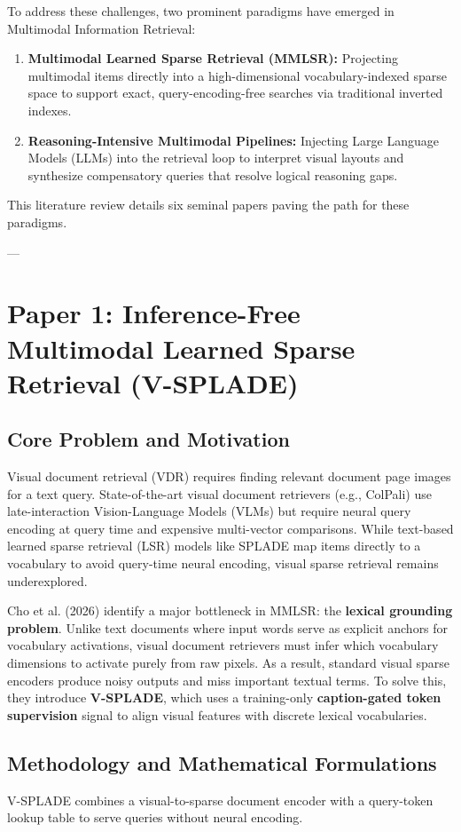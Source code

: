 \documentclass[11pt,a4paper]{article}
\begin{document}
To address these challenges, two prominent paradigms have emerged in Multimodal Information Retrieval:
\begin{enumerate}
    \item \textbf{Multimodal Learned Sparse Retrieval (MMLSR):} Projecting multimodal items directly into a high-dimensional vocabulary-indexed sparse space to support exact, query-encoding-free searches via traditional inverted indexes.
    \item \textbf{Reasoning-Intensive Multimodal Pipelines:} Injecting Large Language Models (LLMs) into the retrieval loop to interpret visual layouts and synthesize compensatory queries that resolve logical reasoning gaps.
\end{enumerate}
This literature review details six seminal papers paving the path for these paradigms.

---

\section{Paper 1: Inference-Free Multimodal Learned Sparse Retrieval (V-SPLADE)}
\label{sec:v_splade}

\subsection{Core Problem and Motivation}
Visual document retrieval (VDR) requires finding relevant document page images for a text query. State-of-the-art visual document retrievers (e.g., ColPali) use late-interaction Vision-Language Models (VLMs) but require neural query encoding at query time and expensive multi-vector comparisons. While text-based learned sparse retrieval (LSR) models like SPLADE map items directly to a vocabulary to avoid query-time neural encoding, visual sparse retrieval remains underexplored.

Cho et al. (2026) identify a major bottleneck in MMLSR: the \textbf{lexical grounding problem}. Unlike text documents where input words serve as explicit anchors for vocabulary activations, visual document retrievers must infer which vocabulary dimensions to activate purely from raw pixels. As a result, standard visual sparse encoders produce noisy outputs and miss important textual terms. To solve this, they introduce \textbf{V-SPLADE}, which uses a training-only \textbf{caption-gated token supervision} signal to align visual features with discrete lexical vocabularies.

\subsection{Methodology and Mathematical Formulations}
V-SPLADE combines a visual-to-sparse document encoder with a query-token lookup table to serve queries without neural encoding.
\end{document}
